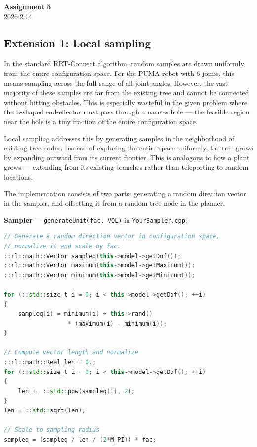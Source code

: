 \documentclass[a4paper,12pt]{article}
\begin{document}
\begin{center}
    \Large \textbf{Assignment 5} \\[6pt]
    2026.2.14
\end{center}

\subsection*{Extension 1: Local sampling} %
In the standard RRT-Connect algorithm, random samples are drawn uniformly from the entire configuration space. For the PUMA robot with 6 joints, this means sampling across the full range of all joint angles. However, the vast majority of these samples are far from the existing tree and cannot be connected without hitting obstacles. This is especially wasteful in the given problem where the L-shaped end-effector must pass through a narrow hole --- the feasible region near the hole is a tiny fraction of the entire configuration space.

Local sampling addresses this by generating samples in the neighborhood of existing tree nodes. Instead of exploring the entire space uniformly, the tree grows by expanding outward from its current frontier. This is analogous to how a plant grows --- extending from its existing branches rather than teleporting to random locations.

The implementation consists of two parts: generating a random direction vector in the sampler, and offsetting it from a random tree node in the planner.

\textbf{Sampler} --- \texttt{generateUnit(fac, VOL)} in \texttt{YourSampler.cpp}:
\begin{lstlisting}[language=C++]
// Generate a random direction vector in configuration space,
// normalize it and scale by fac.
::rl::math::Vector sampleq(this->model->getDof());
::rl::math::Vector maximum(this->model->getMaximum());
::rl::math::Vector minimum(this->model->getMinimum());

for (::std::size_t i = 0; i < this->model->getDof(); ++i)
{
    sampleq(i) = minimum(i) + this->rand()
                  * (maximum(i) - minimum(i));
}

// Compute vector length and normalize
::rl::math::Real len = 0.;
for (::std::size_t i = 0; i < this->model->getDof(); ++i)
{
    len += ::std::pow(sampleq(i), 2);
}
len = ::std::sqrt(len);

// Scale to sampling radius
sampleq = (sampleq / len / (2*M_PI)) * fac;
\end{lstlisting}
\end{document}
